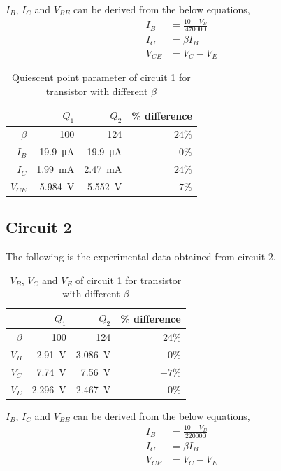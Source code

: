 \documentclass{article}
\begin{document}
$I_B$, $I_C$ and $V_{BE}$ can be derived from the below equations,
\begin{align}\label{eqn:ckt1_2}
  I_B    &= \frac{10-V_B}{470000}\\
  I_C    &= \beta I_B\\
  V_{CE} &= V_C-V_E
\end{align}

\begin{table}[H]
  \caption{Quiescent point parameter of circuit 1 for transistor with different $\beta$}
  \centering
    \begin{tabular}{rrrr}
      \toprule
       &$Q_1$&$Q_2$&\% difference\\
      \midrule
      $\beta$&100&124&$24\%$\\
      $I_B$&\SI{19.9}{\micro\ampere}&\SI{19.9}{\micro\ampere}&$0\%$\\
      $I_C$&\SI{1.99}{\milli\ampere}&\SI{2.47}{\milli\ampere}&$24\%$\\
      $V_{CE}$&\SI{5.984}{\volt}&\SI{5.552}{\volt}&$-7\%$\\
    \bottomrule
  \end{tabular}
  \label{tab:ckt1_calc}%
\end{table}

\newpage

\subsection*{Circuit 2}
The following is the experimental data obtained from circuit 2.

\begin{table}[H]
  \caption{$V_B$, $V_C$ and $V_E$ of circuit 1 for transistor with different $\beta$}
  \centering
    \begin{tabular}{rrrr}
      \toprule
       &$Q_1$&$Q_2$&\% difference\\
      \midrule
      $\beta$&100&124&$24\%$\\
      $V_B$&\SI{2.91 }{\volt}&\SI{3.086}{\volt}&$0\%$\\
      $V_C$&\SI{7.74 }{\volt}&\SI{7.56 }{\volt}&$-7\%$\\
      $V_E$&\SI{2.296}{\volt}&\SI{2.467}{\volt}&$0\%$\\
    \bottomrule
  \end{tabular}
  \label{tab:ckt2_exp}%
\end{table}

$I_B$, $I_C$ and $V_{BE}$ can be derived from the below equations,
\begin{align}\label{eqn:ckt2_2}
  I_B    &= \frac{10-V_B}{220000}\\
  I_C    &= \beta I_B\\
  V_{CE} &= V_C-V_E
\end{align}
\end{document}
